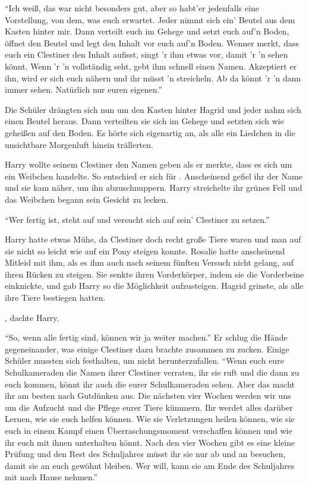 \enquote{Ich weiß, das war nicht besonders gut, aber so habt'er jedenfalls eine Vorstellung, von dem, was euch erwartet. Jeder nimmt sich ein' Beutel aus dem Kasten hinter mir. Dann verteilt euch im Gehege und setzt euch auf'n Boden, öffnet den Beutel und legt den Inhalt vor euch auf'n Boden. Wenner merkt, dass euch ein Clestiner den Inhalt aufisst, singt 'r ihm etwas vor, damit 'r 'n sehen könnt. Wenn 'r 'n vollständig seht, gebt ihm schnell einen Namen. Akzeptiert er ihn, wird er sich euch nähern und ihr müsst 'n streicheln. Ab da könnt 'r 'n dann immer sehen. Natürlich nur euren eigenen.}

Die Schüler drängten sich nun um den Kasten hinter Hagrid und jeder nahm sich einen Beutel heraus. Dann verteilten sie sich im Gehege und setzten sich wie geheißen auf den Boden. Es hörte sich eigenartig an, als alle ein Liedchen in die unsichtbare Morgenluft hinein trällerten.

Harry wollte seinem Clestiner den Namen  geben als er merkte, dass es sich um ein Weibchen handelte. So entschied er sich für . Anscheinend gefiel ihr der Name und sie kam näher, um ihn abzuschnuppern. Harry streichelte ihr grünes Fell und das Weibchen begann sein Gesicht zu lecken.

\enquote{Wer fertig ist, steht auf und versucht sich auf sein' Clestiner zu setzen.}

Harry hatte etwas Mühe, da Clestiner doch recht große Tiere waren und man auf sie nicht so leicht wie auf ein Pony steigen konnte. Rosalie hatte anscheinend Mitleid mit ihm, als es ihm auch nach seinem fünften Versuch nicht gelang, auf ihren Rücken zu steigen. Sie senkte ihren Vorderkörper, indem sie die Vorderbeine einknickte, und gab Harry so die Möglichkeit aufzusteigen. Hagrid grinste, als alle ihre Tiere bestiegen hatten.

, dachte Harry.

\enquote{So, wenn alle fertig sind, können wir ja weiter machen.} Er schlug die Hände gegeneinander, was einige Clestiner dazu brachte zusammen zu zucken. Einige Schüler mussten sich festhalten, um nicht herunterzufallen. \enquote{Wenn euch eure Schulkameraden die Namen ihrer Clestiner verraten, ihr sie ruft und die dann zu euch kommen, könnt ihr auch die eurer Schulkameraden sehen. Aber das macht ihr am besten nach Gutdünken aus. Die nächsten vier Wochen werden wir uns um die Aufzucht und die Pflege eurer Tiere kümmern. Ihr werdet alles darüber Lernen, wie sie euch helfen können. Wie sie Verletzungen heilen können, wie sie euch in einem Kampf einen Überraschungsmoment verschaffen können und wie ihr euch mit ihnen unterhalten könnt. Nach den vier Wochen gibt es eine kleine Prüfung und den Rest des Schuljahres müsst ihr sie nur ab und an besuchen, damit sie an euch gewöhnt bleiben. Wer will, kann sie am Ende des Schuljahres mit nach Hause nehmen.}

